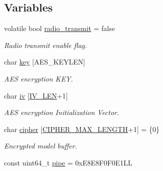 \subsection*{Variables}
\begin{DoxyCompactItemize}
\item 
\mbox{\label{group___radio__module_gaaebbe13533cac0f28446c13ae32b1cb2}} 
volatile bool \mbox{\hyperlink{group___radio__module_gaaebbe13533cac0f28446c13ae32b1cb2}{radio\+\_\+transmit}} = false
\begin{DoxyCompactList}\small\item\em Radio transmit enable flag. \end{DoxyCompactList}\item 
\mbox{\label{group___radio__module_gae0c804caa6b80b155884dc4f7a2d9da3}} 
char \mbox{\hyperlink{group___radio__module_gae0c804caa6b80b155884dc4f7a2d9da3}{key}} \mbox{[}A\+E\+S\+\_\+\+K\+E\+Y\+L\+EN\mbox{]}
\begin{DoxyCompactList}\small\item\em A\+ES encryption K\+EY. \end{DoxyCompactList}\item 
char \mbox{\hyperlink{group___radio__module_ga352378cd7d5875f33dece696475cb8d4}{iv}} \mbox{[}\mbox{\hyperlink{group___radio__module_ga35dc4d7d23c1b86227ceb68e6ebc4fc2}{I\+V\+\_\+\+L\+EN}}+1\mbox{]}
\begin{DoxyCompactList}\small\item\em A\+ES encryption Initialization Vector. \end{DoxyCompactList}\item 
\mbox{\label{group___radio__module_ga4372a894c9299a437425452130748eb8}} 
char \mbox{\hyperlink{group___radio__module_ga4372a894c9299a437425452130748eb8}{cipher}} \mbox{[}\mbox{\hyperlink{group___radio__module_gae634b89476ef10a9d21eacb0da28cd7b}{C\+I\+P\+H\+E\+R\+\_\+\+M\+A\+X\+\_\+\+L\+E\+N\+G\+TH}}+1\mbox{]} = \{0\}
\begin{DoxyCompactList}\small\item\em Encrypted model buffer. \end{DoxyCompactList}\item 
\mbox{\label{group___radio__module_gafe30685f23b8cbf122ddec37280ba8e4}} 
const uint64\+\_\+t \mbox{\hyperlink{group___radio__module_gafe30685f23b8cbf122ddec37280ba8e4}{pipe}} = 0x\+E8\+E8\+F0\+F0\+E1\+LL

\end{DoxyCompactItemize}
